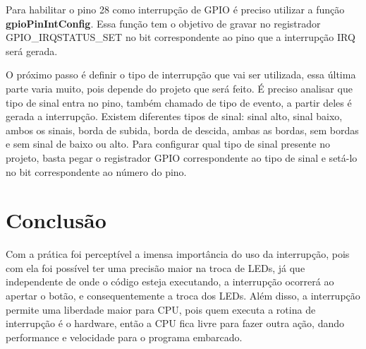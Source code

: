 \documentclass[12pt]{article}
\begin{document}
	Para habilitar o pino 28 como interrupção de GPIO é preciso utilizar a função \textbf{gpioPinIntConfig}. Essa função tem o objetivo de gravar no registrador GPIO\_IRQSTATUS\_SET no bit correspondente ao pino que a interrupção IRQ será gerada. \
	
	O próximo passo é definir o tipo de interrupção que vai ser utilizada, essa última parte varia muito, pois depende do projeto que será feito. É preciso analisar que tipo de sinal entra no pino, também chamado de tipo de evento, a partir deles é gerada a interrupção. Existem diferentes tipos de sinal: sinal alto, sinal baixo, ambos os sinais, borda de subida, borda de descida, ambas as bordas, sem bordas e sem sinal de baixo ou alto. Para configurar qual tipo de sinal presente no projeto, basta pegar o registrador GPIO correspondente ao tipo de sinal e setá-lo no bit correspondente ao número do pino. \
	
\section{Conclusão}
	Com a prática foi perceptível a imensa importância do uso da interrupção, pois com ela foi possível ter uma precisão maior na troca de LEDs, já que independente de onde o código esteja executando, a interrupção ocorrerá ao apertar o botão, e consequentemente a troca dos LEDs. Além disso, a interrupção permite uma liberdade maior para CPU, pois quem executa a rotina de interrupção é o hardware, então a CPU fica livre para fazer outra ação, dando performance e velocidade para o programa embarcado. 
				
\end{document}
